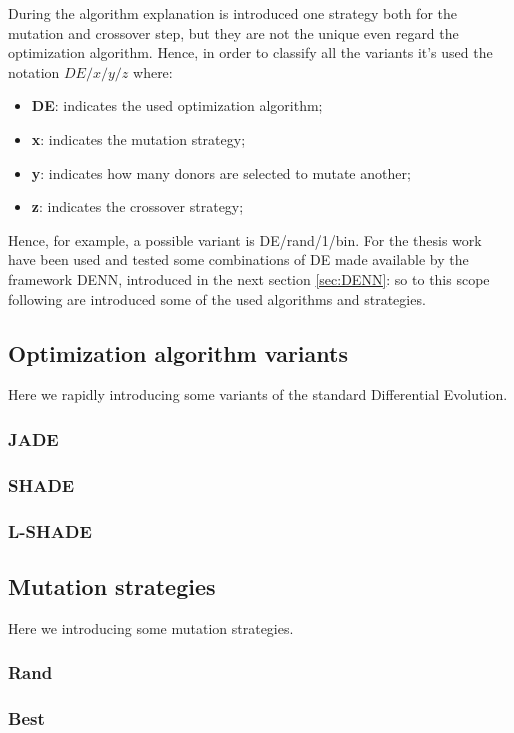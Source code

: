 During the algorithm explanation is introduced one strategy both for the mutation and crossover step, but they are not the unique even regard the optimization algorithm. Hence, in order to classify all the variants it's used the notation $DE/x/y/z$ where:
\begin{itemize}
	\item{\textbf{DE}: indicates the used optimization algorithm;}
	\item{\textbf{x}: indicates the mutation strategy;}
	\item{\textbf{y}: indicates how many donors are selected to mutate another;}
	\item{\textbf{z}: indicates the crossover strategy;}
\end{itemize}
Hence, for example, a possible variant is DE/rand/1/bin. For the thesis work have been used and tested some combinations of DE made available by the framework DENN, introduced in the next section \ref{sec:DENN}: so to this scope following are introduced some of the used algorithms and strategies.
\subsection{Optimization algorithm variants}
Here we rapidly introducing some variants of the standard Differential Evolution.
\subsubsection{JADE}

\subsubsection{SHADE}

\subsubsection{L-SHADE}

\subsection{Mutation strategies}
Here we introducing some mutation strategies.

\subsubsection{Rand}

\subsubsection{Best}

